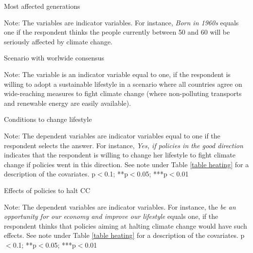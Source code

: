 \documentclass{article}
\begin{document}
\begin{table}[h!]
	\caption{Most affected generations}
	\begin{center}
		\scalebox{0.7}{}
	\end{center}
	{\footnotesize Note: The variables are indicator variables. For instance, \textit{Born in 1960s} equals one if the respondent thinks the people currently between 50 and 60 will be seriously affected by climate change.}
\end{table}		

\begin{table}[h!]
	\caption{Scenario with worlwide consensus}
	\begin{center}
		\scalebox{0.7}{}
	\end{center}
	{\footnotesize Note: The variable is an indicator variable equal to one, if the respondent is willing to adopt a sustainable lifestyle in a scenario where all countries agree on wide-reaching measures to fight climate change (where non-polluting transports and renewable energy are easily available).}
\end{table}		

\begin{landscape}
	\begin{table}[h!]
		\caption{Conditions to change lifestyle}
		\begin{center}
			\scalebox{0.5}{}
		\end{center}
	{\footnotesize Note: The dependent variables are indicator variables equal to one if the respondent selects the answer. For instance, \textit{Yes, if policies in the good direction} indicates that the respondent is willing to change her lifestyle to fight climate change if policies went in this direction. See note under Table \ref{table heating} for a description of the covariates.
	\newline *p$<$0.1; **p$<$0.05; ***p$<$0.01}
	\end{table}		
\end{landscape}

\begin{landscape}
	\begin{table}[h!]
		\caption{Effects of policies to halt CC}
		\begin{center}
			\scalebox{0.6}{}
		\end{center}
	{\footnotesize Note: The dependent variables are indicator variables. For instance, the \textit{be an opportunity for our economy and improve our lifestyle} equals one, if the respondent thinks that policies aiming at halting climate change would have such effects. See note under Table \ref{table heating} for a description of the covariates.
	\newline *p$<$0.1; **p$<$0.05; ***p$<$0.01}
	\end{table}		
\end{landscape}
\end{document}
